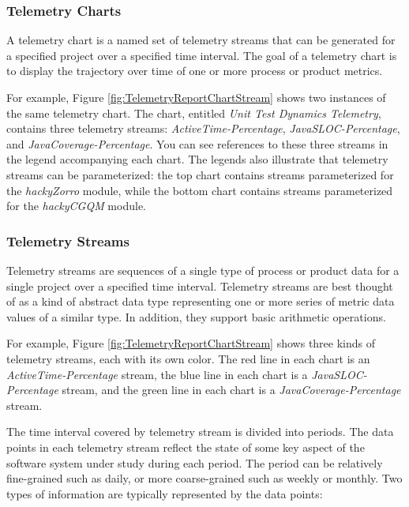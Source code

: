 \subsubsection{Telemetry Charts}

A telemetry chart is a named set of telemetry streams that can be generated for a specified project over a specified time interval. The goal of a telemetry chart is to display the trajectory over time of one or more process or product metrics.

For example, Figure \ref{fig:TelemetryReportChartStream} shows two instances of the same telemetry chart. The chart, entitled \textit{Unit Test Dynamics Telemetry}, contains three telemetry streams: \textit{ActiveTime-Percentage}, \textit{JavaSLOC-Percentage}, and \textit{JavaCoverage-Percentage}. You can see references to these three streams in the legend accompanying each chart. The legends also illustrate that telemetry streams can be parameterized: the top chart contains streams parameterized for the \textit{hackyZorro} module, while the bottom chart contains streams parameterized for the \textit{hackyCGQM} module.




\subsubsection{Telemetry Streams}

Telemetry streams are sequences of a single type of process or product data for a single project over a specified time interval. Telemetry streams are best thought of as a kind of abstract data type representing one or more series of metric data values of a similar type. In addition, they support basic arithmetic operations.

For example, Figure \ref{fig:TelemetryReportChartStream} shows three kinds of telemetry streams, each with its own color. The red line in each chart is an \textit{ActiveTime-Percentage} stream, the blue line in each chart is a \textit{JavaSLOC-Percentage} stream, and the green line in each chart is a \textit{JavaCoverage-Percentage} stream. 

The time interval covered by telemetry stream is divided into periods. The data points in each telemetry stream reflect the state of some key aspect of the software system under study during each period. The period can be relatively fine-grained such as daily, or more coarse-grained such as weekly or monthly. Two types of information are typically represented by the data points: 

